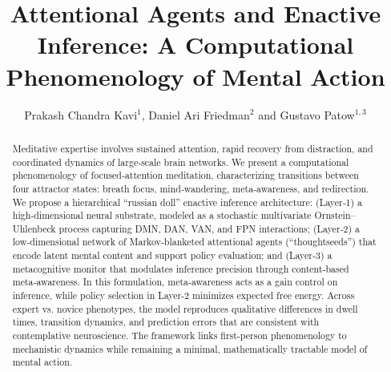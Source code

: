 \documentclass[openacc]{rsproca_new}%
\begin{document}
\title{Attentional Agents and Enactive Inference: A Computational Phenomenology of Mental Action}

\author{Prakash Chandra Kavi$^{1}$, Daniel Ari Friedman$^{2}$ and Gustavo Patow$^{1,3}$}

\address{
$^{1}$Universitat de Girona, Girona 17003, Spain\\
$^{2}$Active Inference Institute, Crescent City, CA 95531, USA\\
$^{3}$Universitat Pompeu Fabra, Barcelona 08002, Spain
}

\subject{agency, computational modeling, mental simulations}



\begin{abstract}
Meditative expertise involves sustained attention, rapid recovery from distraction, and coordinated dynamics of large‑scale brain networks. We present a computational phenomenology of focused‑attention meditation, characterizing transitions between four attractor states: breath focus, mind‑wandering, meta‑awareness, and redirection. We propose a hierarchical “russian doll” enactive inference architecture: (Layer‑1) a high‑dimensional neural substrate, modeled as a stochastic multivariate Ornstein–Uhlenbeck process capturing DMN, DAN, VAN, and FPN interactions; (Layer‑2) a low‑dimensional network of Markov‑blanketed attentional agents (“thoughtseeds”) that encode latent mental content and support policy evaluation; and (Layer‑3) a metacognitive monitor that modulates inference precision through content‑based meta‑awareness. In this formulation, meta‑awareness acts as a gain control on inference, while policy selection in Layer-2 minimizes expected free energy. Across expert vs. novice phenotypes, the model reproduces qualitative differences in dwell times, transition dynamics, and prediction errors that are consistent with contemplative neuroscience. The framework links first‑person phenomenology to mechanistic dynamics while remaining a minimal, mathematically tractable model of mental action.
\end{abstract}
\end{document}
